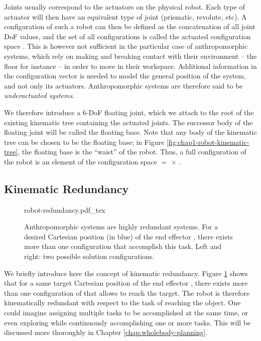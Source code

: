 Joints usually correspond to the actuators on the physical robot. Each
type of actuator will then have an equivalent type of joint
(prismatic, revolute, etc). A configuration \config{} of such a robot
can then be defined as the concatenation of all joint DoF values, and
the set of all configurations is called the actuated configuration
space {\actcspace}. This is however not sufficient in the particular
case of anthropomorphic systems, which rely on making and breaking
contact with their environment -- the floor for instance -- in order
to move in their workspace. Additional information in the
configuration vector is needed to model the general position of the
system, and not only its actuators. Anthropomorphic systems are
therefore said to be \emph{underactuated systems}.

We therefore introduce a 6-DoF floating joint, which we attach to the
root of the existing kinematic tree containing the actuated
joints. The successor body of the floating joint will be called the
floating base. Note that any body of the kinematic tree can be chosen
to be the floating base; in Figure
\ref{fig:chap1-robot-kinematic-tree}, the floating base is the
``waist'' of the robot. Thus, a full configuration \config{} of the
robot {\robot} is an element of the configuration space {\cspace} $=$
{\segroup} $\times$ {\actcspace}.
 
\subsection{Kinematic Redundancy}
\label{subsec:chap1-kinematic-redundancy}

\begin{figure}
  \centering
      {\def\svgwidth{0.8\linewidth}
        
                   {robot-redundancy.pdf_tex}}
      \caption[Kinematic redundancy for anthropomorphic
        systems]{Anthropomorphic systems are highly redundant
        systems. For a desired Cartesian position (in blue) of the end
        effector , there exists more than one configuration
        \config{} that accomplish this task. Left and right: two
        possible solution configurations.}
      \label{fig:chap1-robot-redundancy}
\end{figure}

We briefly introduce here the concept of kinematic redundancy. Figure
\ref{fig:chap1-robot-redundancy} shows that for a same target
Cartesian position of the end effector , there exists more
than one configuration of {\robot} that allows  to
reach the target. The robot {\robot} is therefore
kinematically redundant with respect to the task of reaching the
object. One could imagine assigning multiple tasks to be accomplished
at the same time, or even exploring {\cspace} while continuously
accomplishing one or more tasks. This will be discussed more
thoroughly in Chapter \ref{chap:wholebody-planning}.

